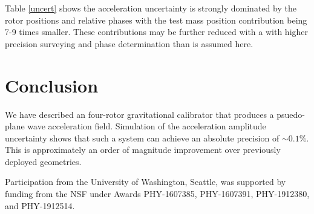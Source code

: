 \documentclass[superscriptaddress, twocolumn, prd]{revtex4-1}
\begin{document}
Table \ref{uncert} shows the acceleration uncertainty is strongly dominated by the rotor positions and relative phases with the test mass position contribution being 7-9 times smaller. These contributions may be further reduced with a  with higher precision surveying and phase determination than is assumed here.
\\
\section{Conclusion} 
\quad We have described an four-rotor gravitational calibrator that produces a psuedo-plane wave acceleration field. Simulation of the acceleration amplitude uncertainty shows that such a system can achieve an absolute precision of $\sim0.1\%$. This is approximately an order of magnitude improvement over previously deployed geometries. \cite{ncal} 

\begin{acknowledgements}

Participation from the University of Washington, Seattle, was supported by funding from the NSF under Awards PHY-1607385, PHY-1607391, PHY-1912380, and PHY-1912514.

\end{acknowledgements}


 

\end{document}
